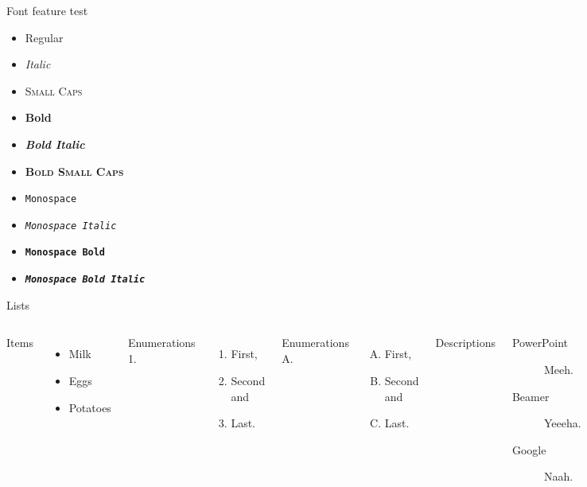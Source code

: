 \documentclass[aspectratio=169,usenames,dvipsnames,pdftex]{beamer}
\begin{document}
	\begin{frame}{Font feature test}
		\begin{itemize}
			\item Regular
			\item \textit{Italic}
			\item \textsc{Small Caps}
			\item \textbf{Bold}
			\item \textbf{\textit{Bold Italic}}
			\item \textbf{\textsc{Bold Small Caps}}
			\item \texttt{Monospace}
			\item \texttt{\textit{Monospace Italic}}
			\item \texttt{\textbf{Monospace Bold}}
			\item \texttt{\textbf{\textit{Monospace Bold Italic}}}
		\end{itemize}
	\end{frame}

	\begin{frame}{Lists}
		\begin{columns}[T, onlytextwidth]
				Items
				\begin{itemize}
					\item Milk \item Eggs \item Potatoes
				\end{itemize}

				Enumerations 1.
				\begin{enumerate}
					\item First, \item Second and \item Last.
				\end{enumerate}

				Enumerations A.
				\begin{enumerate}[A.]
					\item First, \item Second and \item Last.
				\end{enumerate}

				Descriptions
				\begin{description}
					\item[PowerPoint] Meeh. \item[Beamer] Yeeeha. \item[Google] Naah.
				\end{description}
		\end{columns}
	\end{frame}
\end{document}

